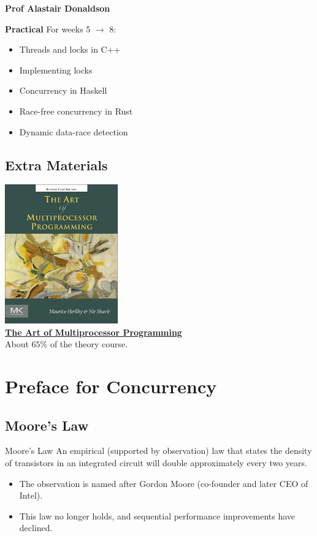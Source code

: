 {\begin{center}
\begin{tikzpicture}
        \end{tikzpicture}
        \centerline{\textbf{Prof Alastair Donaldson}}
    \end{center}
    \textbf{Practical} For weeks 5 $\to$ 8:
    \begin{itemize}
        \item Threads and locks in C++
        \item Implementing locks
        \item Concurrency in Haskell
        \item Race-free concurrency in Rust
        \item Dynamic data-race detection
    \end{itemize}
}

\subsection{Extra Materials}
\begin{center}
    \includegraphics[height=6cm]{introduction/images/the_art_of_multicore_programming.jpg}
    \\ \href{https://cs.ipm.ac.ir/asoc2016/Resources/Theartofmulticore.pdf}{\textbf{The Art of Multiprocessor Programming}}
    \\ About $65\%$ of the theory course.
\end{center}


\section{Preface for Concurrency}
\subsection{Moore's Law}
\begin{definitionbox}{Moore's Law}
    An empirical (supported by observation) law that states the density of transistors in an integrated circuit
    will double approximately every two years.
    \begin{itemize}
        \item The observation is named after Gordon Moore (co-founder and later CEO of Intel).
        \item This law no longer holds, and sequential performance improvements have declined.
    \end{itemize}
\end{definitionbox}

